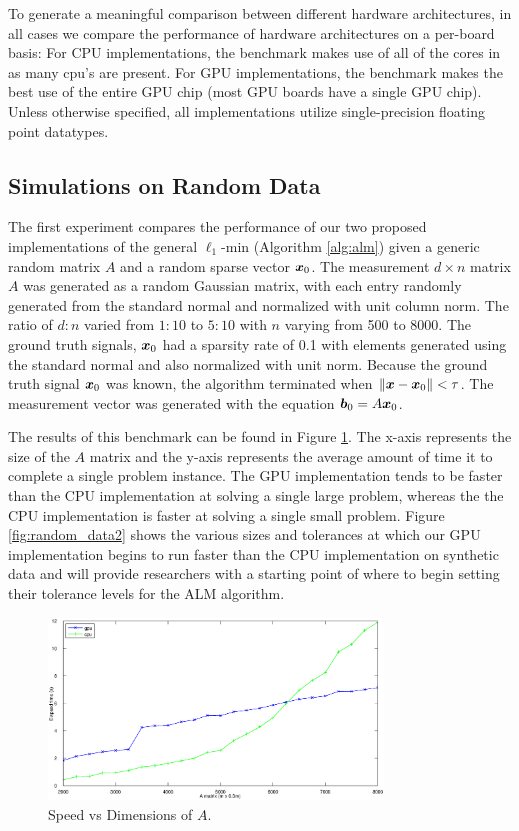 \documentclass[10pt,twocolumn,letterpaper]{article}
\begin{document}
To generate a meaningful comparison between different hardware architectures,
in all cases we compare the performance of hardware architectures on a
per-board basis:  For CPU implementations, the benchmark makes use of all of
the cores in as many cpu's are present.  For GPU implementations, the benchmark
makes the best use of the entire GPU chip (most GPU boards have a single GPU
chip).  Unless otherwise specified, all implementations utilize single-precision floating point datatypes.  

\subsection{Simulations on Random Data}
\label{sec:simulation}

The first experiment compares the performance of our two proposed implementations of 
the general $\ell_1$-min (Algorithm \eqref{alg:alm}) given a generic random matrix $A$ and a random sparse
vector ${\boldsymbol{x}}_0$.  
The measurement $d \times n$ matrix $A$ was generated as a random Gaussian matrix, with each entry
randomly generated from the standard normal and normalized with unit column norm.  The ratio of $d:n$ varied from
$1:10$ to $5:10$ with $n$ varying from 500 to 8000.
The ground truth signals, ${\boldsymbol{x}}_0$ had a sparsity rate of 0.1 with elements generated using the standard normal and also normalized with unit norm.
Because the ground truth signal ${\boldsymbol{x}}_0$ was known, the algorithm terminated
when $\|{\boldsymbol x}-{\boldsymbol x}_0\| < \tau$.
The measurement vector was generated with the equation ${\boldsymbol{b}}_0 = A {\boldsymbol{x}}_0$.   

The results of this benchmark can be found in Figure \ref{fig:random_data}.
The x-axis represents the size of the $A$ matrix and the y-axis represents the
average amount of time it to complete a single problem instance.  The GPU implementation tends to be faster than
the CPU implementation at solving a single large problem, whereas the the CPU
implementation is faster at solving a single small problem.  Figure \ref{fig:random_data2} shows the various sizes and tolerances at which our GPU implementation
begins to run faster than the CPU implementation on synthetic data and will provide researchers 
with a starting point of where to begin setting their tolerance levels for the ALM algorithm.
\begin{figure}
\begin{center}
\includegraphics[width=3.5in]{results/random_data/time_vs_matrix_size_constant_tol}
\end{center}
\caption{Speed vs Dimensions of $A$.}
\label{fig:random_data}
\end{figure}
\end{document}
